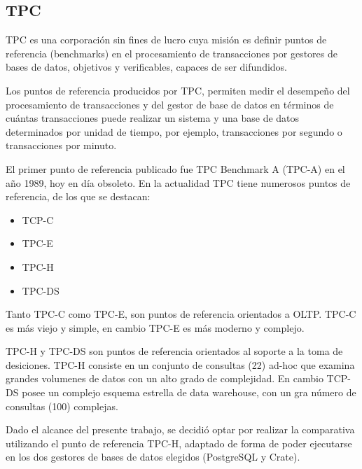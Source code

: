 \documentclass[11pt, twocolumns]{article}
\begin{document}
\begin{multicols}{2}
\section{TPC}
TPC es una corporación sin fines de lucro cuya misión es definir puntos de referencia (benchmarks) en el procesamiento de transacciones por gestores de  bases de datos, objetivos y verificables, capaces de ser difundidos.
\par
Los puntos de referencia producidos por TPC, permiten medir el desempeño del procesamiento de transacciones y del gestor de base de datos en términos de cuántas transacciones puede realizar un sistema y una base de datos determinados por unidad de tiempo, por ejemplo, transacciones por segundo o transacciones por minuto.
\par
El primer punto de referencia publicado fue TPC Benchmark A (TPC-A) en el año 1989, hoy en día obsoleto. En la actualidad TPC tiene numerosos puntos de referencia, de los que se destacan:
\begin{itemize}
  \item TCP-C
  \item TPC-E
  \item TPC-H
  \item TPC-DS
\end{itemize}
\par
Tanto TPC-C como TPC-E, son puntos de referencia orientados a OLTP. TPC-C es más viejo y simple, en cambio TPC-E es más moderno y complejo.
\par
TPC-H y TPC-DS son puntos de referencia orientados al soporte a la toma de desiciones. TPC-H consiste en un conjunto de consultas (22) ad-hoc que examina grandes volumenes de datos con un alto grado de complejidad. En cambio TCP-DS posee un complejo esquema estrella de data warehouse, con un gra número de consultas (100) complejas.
\par
Dado el alcance del presente trabajo, se decidió optar por realizar la comparativa utilizando el punto de referencia TPC-H, adaptado de forma de poder ejecutarse en los dos gestores de bases de datos elegidos (PostgreSQL y Crate).



\end{multicols}
\end{document}
